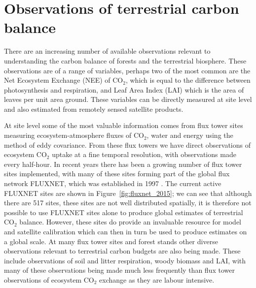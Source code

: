 \documentclass[11pt]{article}
\begin{document}


\section{Observations of terrestrial carbon balance}

There are an increasing number of available observations relevant to understanding the carbon balance of forests and the terrestrial biosphere. These observations are of a range of variables, perhaps two of the most common are the Net Ecosystem Exchange (NEE) of CO\(_{2}\), which is equal to the difference between photosynthesis and respiration, and Leaf Area Index (LAI) which is the area of leaves per unit area ground. These variables can be directly measured at site level and also estimated from remotely sensed satellite products.

At site level some of the most valuable information comes from flux tower sites measuring ecosystem-atmosphere fluxes of CO\(_{2}\), water and energy using the method of eddy covariance. From these flux towers we have direct observations of ecosystem CO\(_{2}\) uptake at a fine temporal resolution, with observations made every half-hour. In recent years there has been a growing number of flux tower sites implemented, with many of these sites forming part of the global flux network FLUXNET, which was established in 1997 \citep{baldocchi2001fluxnet}. The current active FLUXNET sites are shown in Figure~\ref{fig:fluxnet_2015}; we can see that although there are 517 sites, these sites are not well distributed spatially, it is therefore not possible to use FLUXNET sites alone to produce global estimates of terrestrial CO\(_{2}\) balance. However, these sites do provide an invaluable resource for model and satellite calibration which can then in turn be used to produce estimates on a global scale. At many flux tower sites and forest stands other diverse observations relevant to terrestrial carbon budgets are also being made. These include observations of soil and litter respiration, woody biomass and LAI, with many of these observations being made much less frequently than flux tower observations of ecosystem CO\(_{2}\) exchange as they are labour intensive.     
\end{document}
